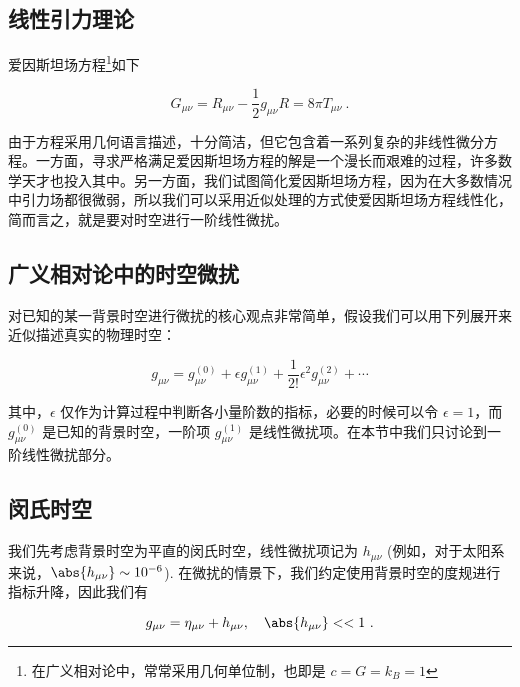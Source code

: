 
\begin{issues}
\issueMissDepend
\issueDraft
\end{issues}



\subsection{线性引力理论}
爱因斯坦场方程\footnote{在广义相对论中，常常采用几何单位制，也即是 $c=G=k_B=1$}如下

\begin{equation}\label{eq_LinGra_2}
G_{\mu \nu} = R_{\mu \nu} - \frac{1}{2}g_{\mu\nu}R = 8\pi T_{\mu\nu}~.
\end{equation}

由于方程采用几何语言描述，十分简洁，但它包含着一系列复杂的非线性微分方程。一方面，寻求严格满足爱因斯坦场方程的解是一个漫长而艰难的过程，许多数学天才也投入其中。另一方面，我们试图简化爱因斯坦场方程，因为在大多数情况中引力场都很微弱，所以我们可以采用近似处理的方式使爱因斯坦场方程线性化，简而言之，就是要对时空进行一阶线性微扰。


\subsection{广义相对论中的时空微扰}

对已知的某一背景时空进行微扰的核心观点非常简单，假设我们可以用下列展开来近似描述真实的物理时空：

\begin{equation}
g_{\mu\nu}=g^{(0)}_{\mu\nu} + \epsilon g^{(1)}_{\mu\nu} + \frac{1}{2!}\epsilon^2 g^{(2)}_{\mu\nu}+\cdots
\end{equation}

其中，$\epsilon $ 仅作为计算过程中判断各小量阶数的指标，必要的时候可以令 $\epsilon = 1 $，而 $g^{(0)}_{\mu\nu} $ 是已知的背景时空，一阶项 $g^{(1)}_{\mu\nu}$ 是线性微扰项。在本节中我们只讨论到一阶线性微扰部分。


\subsection{闵氏时空}

我们先考虑背景时空为平直的闵氏时空，线性微扰项记为 $h_{\mu\nu}$ (例如，对于太阳系来说，$\abs{h_{\mu\nu}} \sim 10^{-6}$). 在微扰的情景下，我们约定使用背景时空的度规进行指标升降，因此我们有

\begin{equation}
g_{\mu\nu} = \eta_{\mu\nu} + h_{\mu\nu}, \quad \abs{h_{\mu\nu}}<<1 ~.
\end{equation}

